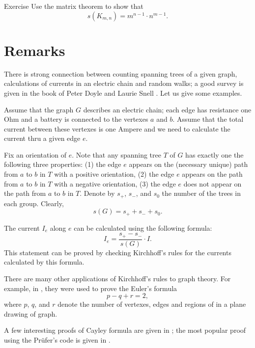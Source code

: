 \begin{thm}{Exercise}
Use the matrix theorem to show that 
\[s(K_{m,n})=m^{n-1}\cdot n^{m-1}.\]
\end{thm}



\section*{Remarks}

There is strong connection between counting spanning trees of a given graph,
calculations of currents in an electric chain 
and random walks; a good survey is given in the book of Peter Doyle and Laurie Snell \cite{doyle-snell}. Let us give some examples.

Assume that the graph $G$ describes an electric chain;
each edge has resistance one Ohm and a battery is connected to the vertexes $a$ and $b$.
Assume that the total current between these vertexes is one Ampere and we need to calculate the current thru a given edge $e$.

Fix an orientation of $e$.
Note that any spanning tree $T$ of $G$ has exactly one the following three properties:
(1) the edge $e$ appears on the (necessary unique) path from $a$ to $b$ in $T$ with a positive orientation,
(2) the edge $e$ appears on the path from $a$ to $b$ in $T$ with a negative orientation,
(3) the edge $e$ does not appear on the path from $a$ to $b$ in $T$.
Denote by $s_+$, $s_-$, and $s_0$ the number of the trees in each group.
Clearly,
\[s(G)=s_++s_-+s_0.\]

The current $I_e$ along $e$ can be calculated using the following formula:
\[I_e=\frac{s_+-s_-}{s(G)}\cdot I.\]
This statement can be proved by checking Kirchhoff's rules for the currents calculated by this formula.

There are many other applications of Kirchhoff's rules to graph theory.
For example, in \cite{levi}, they were used to prove the Euler's formula
\[p-q+r=2,\]
where $p$, $q$, and $r$ denote the number of vertexes, edges and regions of in a plane drawing of graph.

A few interesting proofs of Cayley formula are given in \cite[Chapter 30]{aigner-ziegler};
the most popular proof using the Pr\"ufer's code is given in \cite{hartsfield-ringel}.



